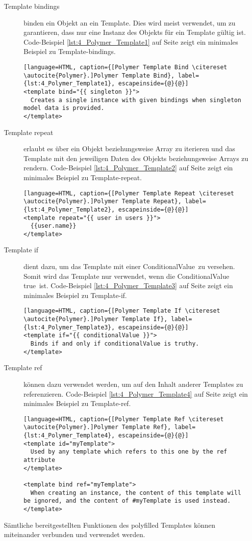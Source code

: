 \begin{description}
\item[Template bindings] binden ein Objekt an ein Template. Dies wird meist verwendet, um zu garantieren, dass nur eine Instanz des Objekts für ein Template gültig ist. Code-Beispiel \ref{lst:4_Polymer_Template1} auf Seite \pageref{lst:4_Polymer_Template1} zeigt ein minimales Beispiel zu Template-bindings.
\begin{lstlisting}[language=HTML, caption={[Polymer Template Bind \citereset \autocite{Polymer}.]Polymer Template Bind}, label={lst:4_Polymer_Template1}, escapeinside={@}{@}]
<template bind="{{ singleton }}">
  Creates a single instance with given bindings when singleton model data is provided.
</template>
\end{lstlisting}

\item[Template repeat] erlaubt es über ein Objekt beziehungsweise Array zu iterieren und das Template mit den jeweiligen Daten des Objekts beziehungsweise Arrays zu rendern. Code-Beispiel \ref{lst:4_Polymer_Template2} auf Seite \pageref{lst:4_Polymer_Template2} zeigt ein minimales Beispiel zu Template-repeat.
\begin{lstlisting}[language=HTML, caption={[Polymer Template Repeat \citereset \autocite{Polymer}.]Polymer Template Repeat}, label={lst:4_Polymer_Template2}, escapeinside={@}{@}]
<template repeat="{{ user in users }}">
  {{user.name}}
</template>
\end{lstlisting}

\item[Template if] dient dazu, um das Template mit einer \glqq ConditionalValue\grqq\ zu versehen. Somit wird das Template nur verwendet, wenn die \glqq ConditionalValue true\grqq\ ist.
Code-Beispiel \ref{lst:4_Polymer_Template3} auf Seite \pageref{lst:4_Polymer_Template3} zeigt ein minimales Beispiel zu Template-if.
\begin{lstlisting}[language=HTML, caption={[Polymer Template If \citereset \autocite{Polymer}.]Polymer Template If}, label={lst:4_Polymer_Template3}, escapeinside={@}{@}]
<template if="{{ conditionalValue }}">
  Binds if and only if conditionalValue is truthy.
</template>
\end{lstlisting}

\item[Template ref] können dazu verwendet werden, um auf den Inhalt anderer Templates zu referenzieren. Code-Beispiel \ref{lst:4_Polymer_Template4} auf Seite \pageref{lst:4_Polymer_Template4} zeigt ein minimales Beispiel zu Template-ref.
\begin{lstlisting}[language=HTML, caption={[Polymer Template Ref \citereset \autocite{Polymer}.]Polymer Template Ref}, label={lst:4_Polymer_Template4}, escapeinside={@}{@}]
<template id="myTemplate">
  Used by any template which refers to this one by the ref attribute
</template>

<template bind ref="myTemplate">
  When creating an instance, the content of this template will be ignored, and the content of #myTemplate is used instead.
</template>
\end{lstlisting}

\end{description}

Sämtliche bereitgestellten Funktionen des polyfilled Templates können miteinander verbunden und verwendet werden.